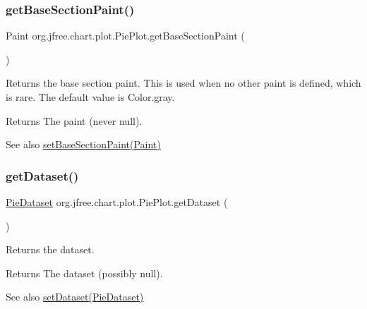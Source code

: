 \subsubsection{\texorpdfstring{get\+Base\+Section\+Paint()}{getBaseSectionPaint()}}
{\footnotesize\ttfamily Paint org.\+jfree.\+chart.\+plot.\+Pie\+Plot.\+get\+Base\+Section\+Paint (\begin{DoxyParamCaption}{ }\end{DoxyParamCaption})}

Returns the base section paint. This is used when no other paint is defined, which is rare. The default value is {\ttfamily Color.\+gray}.

\begin{DoxyReturn}{Returns}
The paint (never {\ttfamily null}).
\end{DoxyReturn}
\begin{DoxySeeAlso}{See also}
\mbox{\hyperlink{classorg_1_1jfree_1_1chart_1_1plot_1_1_pie_plot_a582a3691ba857599da8b77596e812a04}{set\+Base\+Section\+Paint(\+Paint)}} 
\end{DoxySeeAlso}
\mbox{\label{classorg_1_1jfree_1_1chart_1_1plot_1_1_pie_plot_a9216c489ef9e69e91dfc3207b7ab80bb}} 
\subsubsection{\texorpdfstring{get\+Dataset()}{getDataset()}}
{\footnotesize\ttfamily \mbox{\hyperlink{interfaceorg_1_1jfree_1_1data_1_1general_1_1_pie_dataset}{Pie\+Dataset}} org.\+jfree.\+chart.\+plot.\+Pie\+Plot.\+get\+Dataset (\begin{DoxyParamCaption}{ }\end{DoxyParamCaption})}

Returns the dataset.

\begin{DoxyReturn}{Returns}
The dataset (possibly {\ttfamily null}).
\end{DoxyReturn}
\begin{DoxySeeAlso}{See also}
\mbox{\hyperlink{classorg_1_1jfree_1_1chart_1_1plot_1_1_pie_plot_a2be3213da3debc6defe8e1ab9f531194}{set\+Dataset(\+Pie\+Dataset)}} 
\end{DoxySeeAlso}
\mbox{\label{classorg_1_1jfree_1_1chart_1_1plot_1_1_pie_plot_a5406b9adefa8fa24d4328cf9c652abce}} 
